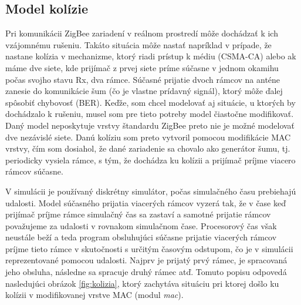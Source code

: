 \documentclass[11pt,twoside,a4paper]{book}
\begin{document}


\subsection{Model kolízie}
Pri komunikácii ZigBee zariadení v reálnom prostredí môže dochádzať k ich vzájomnému rušeniu. Takáto situácia môže nastať napríklad v prípade, že nastane kolízia v mechanizme, ktorý riadi prístup k médiu (CSMA-CA) alebo ak máme dve siete, kde prijímač z prvej siete príme súčasne v jednom okamihu počas svojho stavu Rx, dva rámce. Súčasné prijatie dvoch rámcov na anténe zanesie do komunikácie šum (čo je vlastne prídavný signál), ktorý môže ďalej spôsobiť chybovosť (BER). Keďže, som chcel modelovať aj situácie, u ktorých by dochádzalo k rušeniu, musel som pre tieto potreby model čiastočne modifikovať. Daný model neposkytuje vrstvy štandardu ZigBee preto nie je možné modelovať dve nezávislé siete. Danú kolíziu som preto vytvoril pomocou modifikácie MAC vrstvy, čím som dosiahol, že dané zariadenie sa chovalo ako generátor šumu, tj. periodicky vysiela rámce, s tým, že dochádza ku kolízii a prijímač príjme viacero rámcov súčasne.

V simulácii je používaný diskrétny simulátor, počas simulačného času prebiehajú udalosti. Model súčasného prijatia viacerých rámcov vyzerá tak, že v čase keď prijímač príjme rámce simulačný čas sa zastaví a samotné prijatie rámcov považujeme za udalosti v rovnakom simulačnom čase. Procesorový čas však neustále beží a teda program obsluhujúci súčasne prijatie viacerých rámcov príjme tieto rámce v skutočnosti s určitým časovým odstupom, čo je v simulácii reprezentované pomocou udalosti. Najprv je prijatý prvý rámec, je spracovaná jeho obsluha, následne sa spracuje druhý rámec atď. Tomuto popisu odpovedá nasledujúci obrázok \ref{fig:kolizia}, ktorý zachytáva situáciu pri ktorej došlo ku kolízii v modifikovanej vrstve MAC (modul \textit{mac}).
\end{document}
